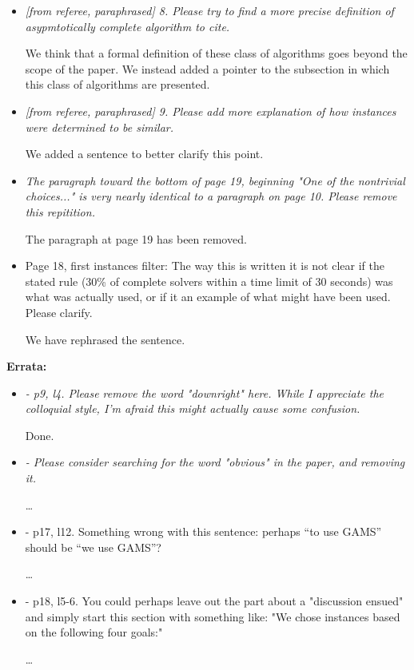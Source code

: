 \documentclass[11pt]{article}
\newcommand{\rep}[1]{{\textcolor{acblue}{#1}}}
\begin{document}
\begin{itemize}
\item 
{\it
[from referee, paraphrased] 8. Please try to find a more precise definition of asypmtotically complete algorithm to 
cite.
} 

\rep{We think that a formal definition of these class of algorithms goes beyond the scope of the paper. We instead added a pointer to the subsection in which this class of algorithms are presented.}

\item 
{\it
[from referee, paraphrased] 9. Please add more explanation of how instances were determined to be similar. 
}

\rep{We added a sentence to better clarify this point.}


\item 
{\it
The paragraph toward the bottom of page 19, beginning "One of the nontrivial choices..." is very nearly identical to a paragraph on page 10. Please remove this repitition. 
}

\rep{The paragraph at page 19 has been removed.}


\item Page 18, first instances filter: The way this is written it is not clear if the stated rule (30\% of complete solvers within a time limit of 30 seconds) was what was actually used, or if it an example of what might have been used. Please clarify. 

\rep{We have rephrased the sentence.}

 
\end{itemize}

\bigskip
\textbf{Errata:}

 \begin{itemize}
 
\item 
{\it
- p9, l4. Please remove the word "downright" here. While I appreciate the colloquial style, I'm afraid this might actually cause some confusion. 
}

\rep{Done.}

\item 
{\it
- Please consider searching for the word "obvious" in the paper, and removing it. 
}

\rep{\dots}

\item 
{\it

- p17, l12. Something wrong with this sentence: perhaps ``to use GAMS'' should be ``we use GAMS''? 
}

\rep{\dots}

\item 
{\it

- p18, l5-6. You could perhaps leave out the part about a "discussion ensued" and simply start this section with something like: "We chose instances based on the following four goals:" 
}

\rep{\dots}

 
\end{itemize}
\end{document}

